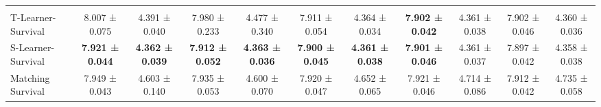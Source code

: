 \begin{table}[htbp]
{\begin{adjustbox}{angle=90,max height=0.95\textheight,center}
\begin{minipage}{\textheight}
\begin{adjustbox}{max width=\linewidth}
\begin{minipage}[c]{\linewidth}
\begin{adjustbox}{max width=\linewidth}
\begin{tabular}{l cc cc cc cc cc}
        \addlinespace
        \multicolumn{9}{l}{\textit{Survival Meta-Learners}} \\ 
        T-Learner-Survival & 8.007 ± 0.075 & 4.391 ± 0.040 & 7.980 ± 0.233 & 4.477 ± 0.340 & 7.911 ± 0.054 & 4.364 ± 0.034 & \textbf{7.902 ± 0.042} & 4.361 ± 0.038 & 7.902 ± 0.046 & 4.360 ± 0.036 \\
        S-Learner-Survival & \textbf{7.921 ± 0.044} & \textbf{4.362 ± 0.039} & \textbf{7.912 ± 0.052} & \textbf{4.363 ± 0.036} & \textbf{7.900 ± 0.045} & \textbf{4.361 ± 0.038} & \textbf{7.901 ± 0.046} & 4.361 ± 0.037 & 7.897 ± 0.042 & 4.358 ± 0.038 \\
        Matching Survival & 7.949 ± 0.043 & 4.603 ± 0.140 & 7.935 ± 0.053 & 4.600 ± 0.070 & 7.920 ± 0.047 & 4.652 ± 0.065 & 7.921 ± 0.046 & 4.714 ± 0.086 & 7.912 ± 0.042 & 4.735 ± 0.058 \\ 
        \bottomrule
    \end{tabular}\end{adjustbox}
    \end{minipage}\end{adjustbox}\par

    


\end{minipage}
\end{adjustbox}}
\end{table}
